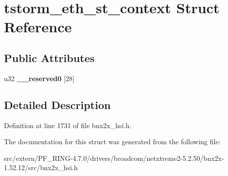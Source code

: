 \hypertarget{structtstorm__eth__st__context}{
\section{tstorm\_\-eth\_\-st\_\-context Struct Reference}
\label{structtstorm__eth__st__context}
}
\subsection*{Public Attributes}
\begin{DoxyCompactItemize}
\item 
\hypertarget{structtstorm__eth__st__context_afaf9140f27a18ffad25e718534543ec1}{
u32 {\bfseries \_\-\_\-reserved0} \mbox{[}28\mbox{]}}
\label{structtstorm__eth__st__context_afaf9140f27a18ffad25e718534543ec1}

\end{DoxyCompactItemize}


\subsection{Detailed Description}


Definition at line 1731 of file bnx2x\_\-hsi.h.



The documentation for this struct was generated from the following file:\begin{DoxyCompactItemize}
\item 
src/extern/PF\_\-RING-\/4.7.0/drivers/broadcom/netxtreme2-\/5.2.50/bnx2x-\/1.52.12/src/bnx2x\_\-hsi.h\end{DoxyCompactItemize}
